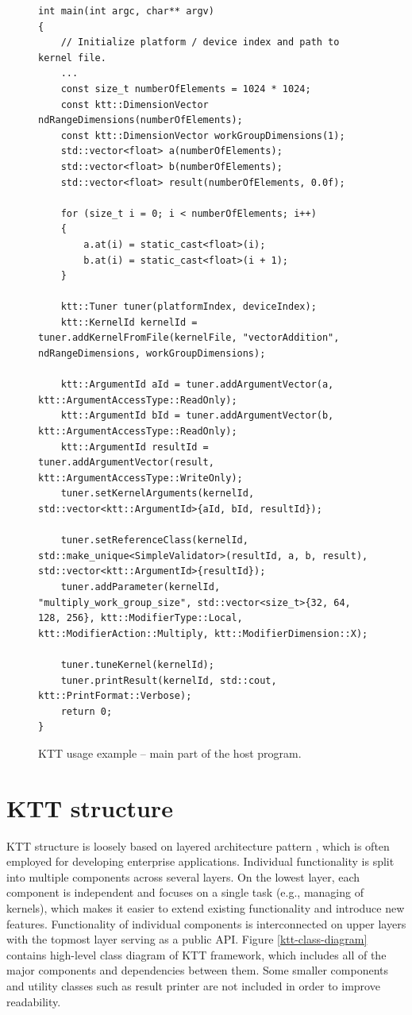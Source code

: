 \documentclass
[
    digital, %
    oneside, %
    table, %
    nolof, %
    nolot, %
    nocover %
]{fithesis3}
\begin{document}
\begin{figure}
\footnotesize
\begin{adjustwidth}{-1cm}{-1cm}
\begin{lstlisting}
int main(int argc, char** argv)
{
    // Initialize platform / device index and path to kernel file.
    ...
    const size_t numberOfElements = 1024 * 1024;
    const ktt::DimensionVector ndRangeDimensions(numberOfElements);
    const ktt::DimensionVector workGroupDimensions(1);
    std::vector<float> a(numberOfElements);
    std::vector<float> b(numberOfElements);
    std::vector<float> result(numberOfElements, 0.0f);
    
    for (size_t i = 0; i < numberOfElements; i++)
    {
        a.at(i) = static_cast<float>(i);
        b.at(i) = static_cast<float>(i + 1);
    }
    
    ktt::Tuner tuner(platformIndex, deviceIndex);
    ktt::KernelId kernelId = tuner.addKernelFromFile(kernelFile, "vectorAddition", ndRangeDimensions, workGroupDimensions);
    
    ktt::ArgumentId aId = tuner.addArgumentVector(a, ktt::ArgumentAccessType::ReadOnly);
    ktt::ArgumentId bId = tuner.addArgumentVector(b, ktt::ArgumentAccessType::ReadOnly);
    ktt::ArgumentId resultId = tuner.addArgumentVector(result, ktt::ArgumentAccessType::WriteOnly);
    tuner.setKernelArguments(kernelId, std::vector<ktt::ArgumentId>{aId, bId, resultId});
    
    tuner.setReferenceClass(kernelId, std::make_unique<SimpleValidator>(resultId, a, b, result), std::vector<ktt::ArgumentId>{resultId});
    tuner.addParameter(kernelId, "multiply_work_group_size", std::vector<size_t>{32, 64, 128, 256}, ktt::ModifierType::Local, ktt::ModifierAction::Multiply, ktt::ModifierDimension::X);
    
    tuner.tuneKernel(kernelId);
    tuner.printResult(kernelId, std::cout, ktt::PrintFormat::Verbose);
    return 0;
}
\end{lstlisting}
\caption{KTT usage example -- main part of the host program.}
\label{ktt-api-usage}
\end{adjustwidth}
\end{figure}

\chapter{KTT structure}
\label{ktt-structure}
KTT structure is loosely based on layered architecture pattern \cite{software-architectures}, which is often employed for developing enterprise
applications. Individual functionality is split into multiple components across several layers. On the lowest layer, each component is independent and
focuses on a single task (e.g., managing of kernels), which makes it easier to extend existing functionality and introduce new features. Functionality
of individual components is interconnected on upper layers with the topmost layer serving as a public API. Figure \ref{ktt-class-diagram} contains
high-level class diagram of KTT framework, which includes all of the major components and dependencies between them. Some smaller components and utility
classes such as result printer are not included in order to improve readability.
\end{document}
